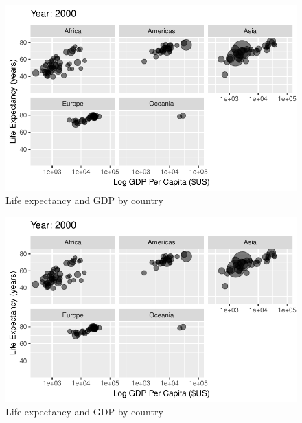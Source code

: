 \documentclass[
  letterpaper,
  DIV=11,
  numbers=noendperiod]{scrreport}
\theoremstyle{definition}
\theoremstyle{remark}
\begin{document}
\begin{figure}

{\centering \includegraphics{index_files/figure-pdf/fig-anim-lifegdp-87.pdf}

}

\caption{\label{fig-anim-lifegdp-87}Life expectancy and GDP by country}

\end{figure}

\begin{figure}

{\centering \includegraphics{index_files/figure-pdf/fig-anim-lifegdp-88.pdf}

}

\caption{\label{fig-anim-lifegdp-88}Life expectancy and GDP by country}

\end{figure}
\end{document}

